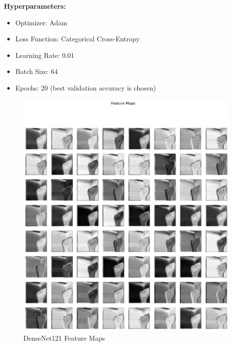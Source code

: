 \documentclass[12pt, a4paper]{article}
\begin{document}
\textbf{Hyperparameters:}
\begin{itemize}
    \item Optimizer: Adam
    \item Loss Function: Categorical Cross-Entropy
    \item Learning Rate: 0.01
    \item Batch Size: 64
    \item Epochs: 20 (best validation accuracy is chosen)
\end{itemize}
\begin{figure}[H]
    \centering
    \includegraphics[width=\textwidth]{../../plots/DenseNet121_Visualize.png}
    \caption{DenseNet121 Feature Maps}
    \label{fig:densenet121_visualize}
\end{figure}
\end{document}
